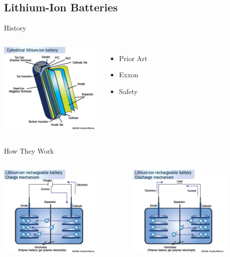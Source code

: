 \documentclass{beamer}
\begin{document}
\subsection{Lithium-Ion Batteries}

\begin{frame}{History}
  \begin{columns}
    \column{5cm}
      \includegraphics[width=5cm]{lionSummary.jpg}
    \column{5cm}
      \begin{itemize}
      \item Prior Art
      \item Exxon %
      \item Safety
      \end{itemize}
  \end{columns}
\end{frame}

\begin{frame}{How They Work}
  \begin{columns}
    \begin{column}{5cm}
      \includegraphics[width=5cm]{lionCharge.jpg}
    \end{column}
    \begin{column}{5cm}
      \includegraphics[width=5cm]{lionDischarge.jpg}
    \end{column}
  \end{columns}
\end{frame}
\end{document}
